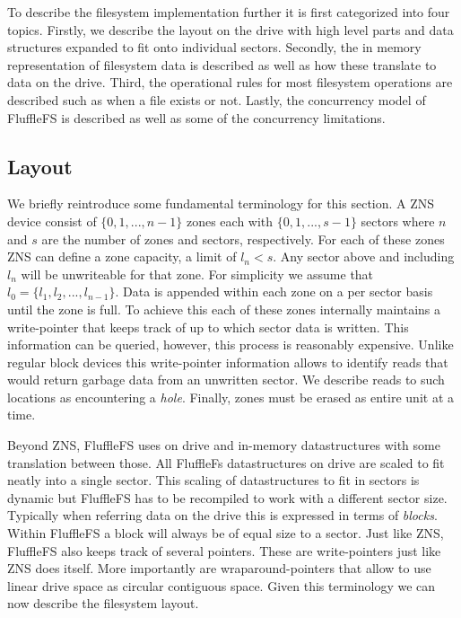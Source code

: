 To describe the filesystem implementation further it is first categorized into
four topics. Firstly, we describe the layout on the drive with high level parts
and data structures expanded to fit onto individual sectors. Secondly, the
in memory representation of filesystem data is described as well as how these
translate to data on the drive. Third, the operational rules for most filesystem
operations are described such as when a file exists or not. Lastly, the
concurrency model of FluffleFS is described as well as some of the concurrency
limitations.

\subsection{Layout}

We briefly reintroduce some fundamental terminology for this section. A ZNS
device consist of $\{0,1,...,n-1\}$ zones each with $\{0,1,...,s-1\}$ sectors
where $n$ and $s$ are the number of zones and sectors, respectively. For each of
these zones ZNS can define a zone capacity, a limit of $l_{n} < s$. Any sector
above and including $l_{n}$ will be unwriteable for that zone. For simplicity we
assume that $l_{0} = \{l_{1},l_{2},...,l_{n-1}\}$. Data is appended within each
zone on a per sector basis until the zone is full. To achieve this each of these
zones internally maintains a write-pointer that keeps track of up to which
sector data is written. This information can be queried, however, this process
is reasonably expensive. Unlike regular block devices this write-pointer
information allows to identify reads that would return garbage data from an
unwritten sector. We describe reads to such locations as encountering a
\textit{hole}. Finally, zones must be erased as entire unit at a time.

Beyond ZNS, FluffleFS uses on drive and in-memory datastructures with some
translation between those. All FluffleFs datastructures on drive are scaled to
fit neatly into a single sector. This scaling of datastructures to fit in
sectors is dynamic but FluffleFS has to be recompiled to work with a different
sector size. Typically when referring data on the drive this is expressed in
terms of \textit{blocks}. Within FluffleFS a block will always be of equal size
to a sector. Just like ZNS, FluffleFS also keeps track of several pointers.
These are write-pointers just like ZNS does itself. More importantly are
wraparound-pointers that allow to use linear drive space as circular contiguous
space. Given this terminology we can now describe the filesystem layout.

